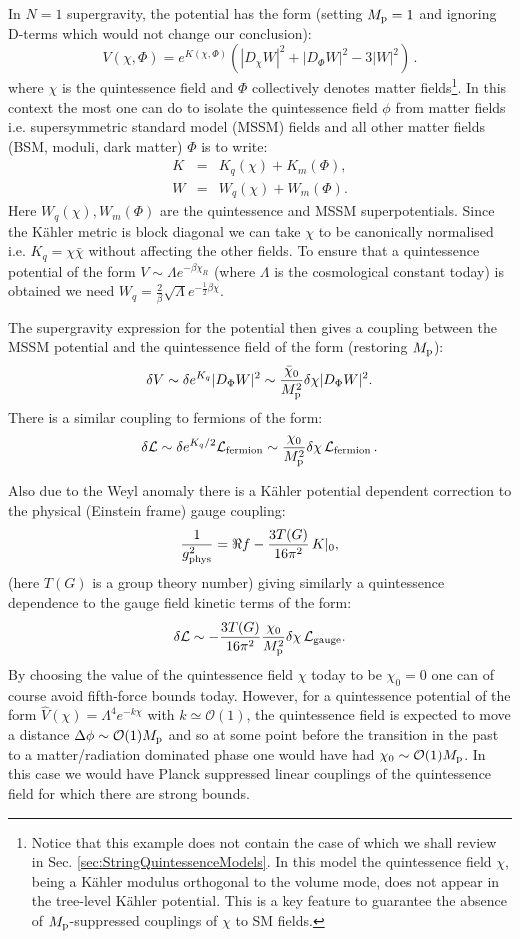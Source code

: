 \documentclass[11pt,a4paper]{article}
\newcommand{\be}{\begin{equation}}
\newcommand{\ee}{\end{equation}}
\newcommand{\mc}{\mathcal}
\begin{document}
\begin{itemize}
In $N=1$ supergravity, the potential has the form (setting $M_{\rm p} = 1$ and ignoring D-terms which would not change our conclusion):
\be
V(\chi,\Phi)=e^{K(\chi,\Phi)}(|D_{\chi}W|^{2}+|D_{\Phi}W|^{2}-3|W|^2) \,.
\label{eq:V}
\ee
where $\chi$ is the quintessence field and $\Phi$ collectively denotes matter fields\footnote{Notice that this example does not contain the case of \cite{Cicoli:2012tz} which we shall review in Sec. \ref{sec:StringQuintessenceModels}. In this model the quintessence field $\chi$, being a K\"ahler modulus orthogonal to the volume mode, does not appear in the tree-level K\"ahler potential. This is a key feature to guarantee the absence of $M_{\rm p}$-suppressed couplings of $\chi$ to SM fields.}. In this context the most one can do to isolate the quintessence field $\phi$ from matter fields i.e. supersymmetric standard model (MSSM) fields and all other matter fields (BSM, moduli, dark matter) $\Phi$ is to write:
\begin{eqnarray}
K & = & K_{q}(\chi)+K_{m}(\Phi),\label{eq:K}\\
W & = & W_{q}(\chi)+W_{m}(\Phi).\label{eq:W}
\end{eqnarray}
Here $W_q(\chi),W_m(\Phi)$ are the quintessence and MSSM superpotentials. Since the K\"ahler metric is block diagonal we can take $\chi$ to be canonically normalised i.e. $K_q=\chi\bar{\chi}$ without affecting the other fields. To ensure that a quintessence potential of the form $V\sim\Lambda e^{-\beta\chi_{R}}$ (where $\Lambda$ is the cosmological constant today) is obtained we need $W_q=\frac{2}{\beta}\sqrt{\Lambda}e^{-\frac12 \beta\chi}$. 

The supergravity expression for the potential then gives a coupling between the MSSM potential and the quintessence field of the form (restoring $M_{\rm p}$):
\be
\delta V\sim\delta e^{K_q}|D_\Phi W|^{2}\sim\frac{\bar{\chi}_{0}}{M_{\rm p}^2}\delta\chi|D_\Phi W|^2.
\label{eq:qhiggs}
\ee
There is a similar coupling to fermions of the form: 
\be
\delta{\cal L}\sim\delta e^{K_{q}/2}{\cal L}_{{\rm fermion}}\sim\frac{\chi_0}{M_{\rm p}^2}\delta\chi \, {\cal L}_{{\rm fermion}} \,.
\label{eq:qfermi}
\ee

Also due to the Weyl anomaly there is a K\"ahler potential dependent correction to the physical (Einstein frame) gauge coupling:
\be
\frac{1}{g_{\rm phys}^2}=\Re f-\frac{3T(G)}{16\pi^2} \, K|_0,
\ee
(here $T(G)$ is a group theory number) giving similarly a quintessence dependence to the gauge field kinetic terms of the form:
\be
\delta{\cal L}\sim-\frac{3T(G)}{16\pi^{2}}\frac{\chi_{0}}{M_{\rm p}^2}\delta\chi \, {\cal {\cal L}}_{{\rm gauge}}.
\label{eq:qgauge}
\ee
By choosing the value of the quintessence field $\chi$ today to be $\chi_0=0$ one can of course avoid fifth-force bounds today. However, for a quintessence potential of the form $\hat{V}(\chi) = \Lambda^4 e^{-k \chi}$ with $k \simeq \mc{O}(1)$, the quintessence field is expected to move a distance $\Delta\phi\sim \mc{O}(1) M_{\rm p}$ and so at some point before the transition in the past to a matter/radiation dominated phase one would have had $\chi_{0}\sim \mc{O}(1) M_{\rm p}$. In this case we would have Planck suppressed linear couplings of the quintessence field for which there are strong bounds. 


\end{itemize}
\end{document}
